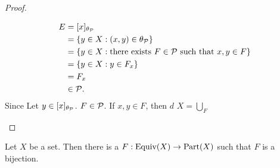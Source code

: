 \documentclass{book}
\begin{document}
\begin{proof}
\begin{enumerate}
			\begin{align*}
				E
				& = [x]_{\theta_{\mathcal{P}}} \\
				& = \{y \in X: (x,y) \in \theta_{\mathcal{P}}\} \\
				& = \{y \in X: \text{there exists $F \in \mathcal{P}$ such that $x,y \in F$}\} \\
				& = \{y \in X: y \in F_x\} \\
				& = F_x \\
				& \in \mathcal{P}.
			\end{align*}
			Since 
			Let $y \in [x]_{\theta_{\mathcal{P}}}$.  $F \in \mathcal{P}$. If $x,y \in F$, then $d$ $X = \bigcup\limits_{F}$
		\end{enumerate}
	\end{proof}
	
	\begin{ex}
		Let $X$ be a set. Then there is a $F: \operatorname*{\text{Equiv}}(X) \rightarrow \text{Part}(X)$ such that $F$ is a bijection. 
	\end{ex}
	
\end{document}
